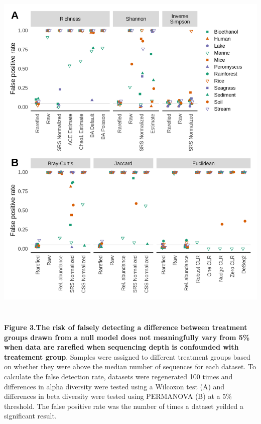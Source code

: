 \documentclass[
]{article}
\begin{document}
\newpage

\includegraphics[height=17cm]{figure_3.png}

\textbf{Figure 3.The risk of falsely detecting a difference between
treatment groups drawn from a null model does not meaningfully vary from
5\% when data are rarefied when sequencing depth is confounded with
treatement group}. Samples were assigned to different treatment groups
based on whether they were above the median number of sequences for each
dataset. To calculate the false detection rate, datasets were
regenerated 100 times and differences in alpha diversity were tested
using a Wilcoxon test (A) and differences in beta diversity were tested
using PERMANOVA (B) at a 5\% threshold. The false positive rate was the
number of times a dataset yeilded a significant result.

\newpage
\end{document}
